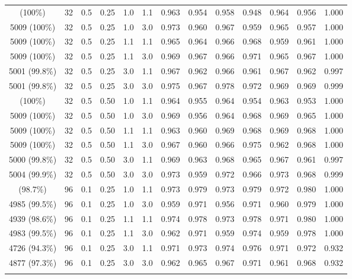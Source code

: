 \begin{longtable}[t]{ccccccrrrrrrc}
\addlinespace
5008 (100\%) & 32 & 0.5 & 0.25 & 1.0 & 1.1 & 0.963 & 0.954 & 0.958 & 0.948 & 0.964 & 0.956 & 1.000\\
5009 (100\%) & 32 & 0.5 & 0.25 & 1.0 & 3.0 & 0.973 & 0.960 & 0.967 & 0.959 & 0.965 & 0.957 & 1.000\\
5009 (100\%) & 32 & 0.5 & 0.25 & 1.1 & 1.1 & 0.965 & 0.964 & 0.966 & 0.968 & 0.959 & 0.961 & 1.000\\
5009 (100\%) & 32 & 0.5 & 0.25 & 1.1 & 3.0 & 0.969 & 0.967 & 0.966 & 0.971 & 0.965 & 0.967 & 1.000\\
5001 (99.8\%) & 32 & 0.5 & 0.25 & 3.0 & 1.1 & 0.967 & 0.962 & 0.966 & 0.961 & 0.967 & 0.962 & 0.997\\
5001 (99.8\%) & 32 & 0.5 & 0.25 & 3.0 & 3.0 & 0.975 & 0.967 & 0.978 & 0.972 & 0.969 & 0.969 & 0.999\\
\addlinespace
5008 (100\%) & 32 & 0.5 & 0.50 & 1.0 & 1.1 & 0.964 & 0.955 & 0.964 & 0.954 & 0.963 & 0.953 & 1.000\\
5009 (100\%) & 32 & 0.5 & 0.50 & 1.0 & 3.0 & 0.969 & 0.956 & 0.964 & 0.968 & 0.969 & 0.965 & 1.000\\
5009 (100\%) & 32 & 0.5 & 0.50 & 1.1 & 1.1 & 0.963 & 0.960 & 0.969 & 0.968 & 0.969 & 0.968 & 1.000\\
5009 (100\%) & 32 & 0.5 & 0.50 & 1.1 & 3.0 & 0.967 & 0.960 & 0.966 & 0.975 & 0.962 & 0.968 & 1.000\\
5000 (99.8\%) & 32 & 0.5 & 0.50 & 3.0 & 1.1 & 0.969 & 0.963 & 0.968 & 0.965 & 0.967 & 0.961 & 0.997\\
5004 (99.9\%) & 32 & 0.5 & 0.50 & 3.0 & 3.0 & 0.973 & 0.959 & 0.972 & 0.966 & 0.973 & 0.968 & 0.999\\
\addlinespace
4944 (98.7\%) & 96 & 0.1 & 0.25 & 1.0 & 1.1 & 0.973 & 0.979 & 0.973 & 0.979 & 0.972 & 0.980 & 1.000\\
4985 (99.5\%) & 96 & 0.1 & 0.25 & 1.0 & 3.0 & 0.959 & 0.971 & 0.956 & 0.971 & 0.960 & 0.979 & 1.000\\
4939 (98.6\%) & 96 & 0.1 & 0.25 & 1.1 & 1.1 & 0.974 & 0.978 & 0.973 & 0.978 & 0.971 & 0.980 & 1.000\\
4983 (99.5\%) & 96 & 0.1 & 0.25 & 1.1 & 3.0 & 0.962 & 0.971 & 0.959 & 0.974 & 0.959 & 0.978 & 1.000\\
4726 (94.3\%) & 96 & 0.1 & 0.25 & 3.0 & 1.1 & 0.971 & 0.973 & 0.974 & 0.976 & 0.971 & 0.972 & 0.932\\
4877 (97.3\%) & 96 & 0.1 & 0.25 & 3.0 & 3.0 & 0.962 & 0.965 & 0.967 & 0.971 & 0.961 & 0.968 & 0.932\\
\addlinespace

\end{longtable}
